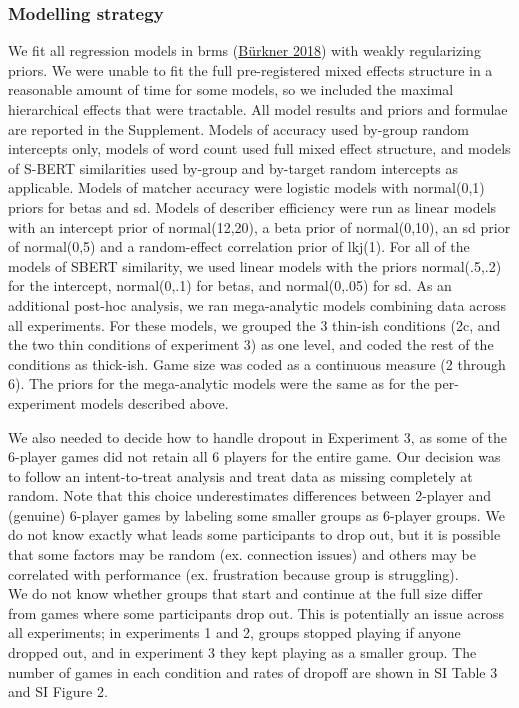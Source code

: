 \documentclass[
  english,
]{article}
\begin{document}
\hypertarget{modelling-strategy}{%
\subsubsection{Modelling strategy}\label{modelling-strategy}}

We fit all regression models in brms (\protect\hyperlink{ref-burkner2018}{Bürkner 2018}) with weakly regularizing priors.
We were unable to fit the full pre-registered mixed effects structure in a reasonable amount of time for some models, so we included the maximal hierarchical effects that were tractable.
All model results and priors and formulae are reported in the Supplement.
Models of accuracy used by-group random intercepts only, models of word count used full mixed effect structure, and models of S-BERT similarities used by-group and by-target random intercepts as applicable.
Models of matcher accuracy were logistic models with normal(0,1) priors for betas and sd.
Models of describer efficiency were run as linear models with an intercept prior of normal(12,20), a beta prior of normal(0,10), an sd prior of normal(0,5) and a random-effect correlation prior of lkj(1).
For all of the models of SBERT similarity, we used linear models with the priors normal(.5,.2) for the intercept, normal(0,.1) for betas, and normal(0,.05) for sd.
As an additional post-hoc analysis, we ran mega-analytic models combining data across all experiments.
For these models, we grouped the 3 thin-ish conditions (2c, and the two thin conditions of experiment 3) as one level, and coded the rest of the conditions as thick-ish.
Game size was coded as a continuous measure (2 through 6). The priors for the mega-analytic models were the same as for the per-experiment models described above.

We also needed to decide how to handle dropout in Experiment 3, as some of the 6-player games did not retain all 6 players for the entire game.
Our decision was to follow an intent-to-treat analysis and treat data as missing completely at random.
Note that this choice underestimates differences between 2-player and (genuine) 6-player games by labeling some smaller groups as 6-player groups.
We do not know exactly what leads some participants to drop out, but it is possible that some factors may be random (ex. connection issues) and others may be correlated with performance (ex. frustration because group is struggling).\\
We do not know whether groups that start and continue at the full size differ from games where some participants drop out.
This is potentially an issue across all experiments; in experiments 1 and 2, groups stopped playing if anyone dropped out, and in experiment 3 they kept playing as a smaller group.
The number of games in each condition and rates of dropoff are shown in SI Table 3 and SI Figure 2.
\end{document}
